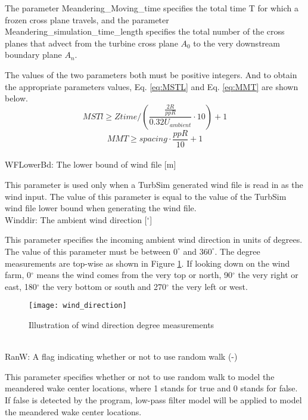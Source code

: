 \documentclass{umthesis}
\begin{document}
The parameter Meandering\_Moving\_time specifies the total time T for which a frozen cross plane travels, and the parameter Meandering\_simulation\_time\_length specifies the total number of the cross planes that advect from the turbine cross plane $A_0$ to the very downstream boundary plane $A_n$.

The values of the two parameters both must be positive integers. And to obtain the appropriate parameters values, Eq. \ref{eq:MSTL} and Eq. \ref{eq:MMT} are shown below.
\begin{equation}\label{eq:MSTL}
  MSTl\geq Ztime/(\frac{\frac{2R}{ppR}}{0.32U_{ambient}}\cdot 10)+1
\end{equation}
\begin{equation}\label{eq:MMT}
  MMT\geq spacing\cdot\frac{ppR}{10}+1
\end{equation}
\\

\noindent WFLowerBd: The lower bound of wind file [m]

This parameter is used only when a TurbSim generated wind file is read in as the wind input. The value of this parameter is equal to the value of the TurbSim wind file lower bound when generating the wind file.\\

\noindent Winddir: The ambient wind direction [$ ^\circ $]

This parameter specifies the incoming ambient wind direction in units of degrees. The value of this parameter must be between $0^\circ$ and $360^\circ$. The degree measurements are top-wise as shown in Figure \ref{fig:wind_direction}. If looking down on the wind farm, 0$^\circ$ means the wind comes from the very top or north, 90$^\circ$ the very right or east, 180$^\circ$ the very bottom or south and 270$^\circ$ the very left or west.
\begin{figure}
  \centering
  \texttt{[image: wind\_direction]}
  \caption{Illustration of wind direction degree measurements}\label{fig:wind_direction}
\end{figure}
\\

\noindent RanW: A flag indicating whether or not to use random walk (-)

This parameter specifies whether or not to use random walk to model the meandered wake center locations, where 1 stands for true and 0 stands for false. If false is detected by the program, low-pass filter model will be applied to model the meandered wake center locations.\\
\end{document}
